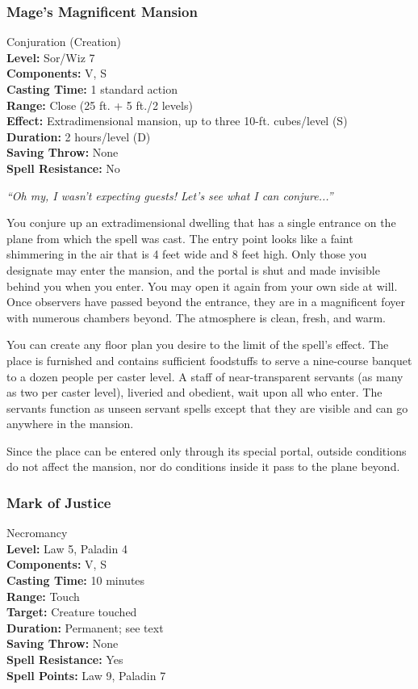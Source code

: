 \subsubsection{Mage's Magnificent Mansion}
\label{Spell:MagnificentMansion}
Conjuration (Creation)
\\ \textbf{Level:} Sor/Wiz 7
\\ \textbf{Components:} V, S
\\ \textbf{Casting Time:} 1 standard action
\\ \textbf{Range:} Close (25 ft. + 5 ft./2 levels)
\\ \textbf{Effect:} Extradimensional mansion, up to three 10-ft. cubes/level (S)
\\ \textbf{Duration:} 2 hours/level (D)
\\ \textbf{Saving Throw:} None
\\ \textbf{Spell Resistance:} No

\emph{``Oh my, I wasn't expecting guests! Let's see what I can conjure...''}

You conjure up an extradimensional dwelling that has a single entrance on the plane from which the spell was cast. 
The entry point looks like a faint shimmering in the air that is 4 feet wide and 8 feet high. 
Only those you designate may enter the mansion, and the portal is shut and made invisible behind you when you enter. 
You may open it again from your own side at will. Once observers have passed beyond the entrance, they are in a magnificent foyer with numerous chambers beyond. 
The atmosphere is clean, fresh, and warm.

You can create any floor plan you desire to the limit of the spell's effect. 
The place is furnished and contains sufficient foodstuffs to serve a nine-course banquet to a dozen people per caster level. 
A staff of near-transparent servants (as many as two per caster level), liveried and obedient, wait upon all who enter. 
The servants function as unseen servant spells except that they are visible and can go anywhere in the mansion.

Since the place can be entered only through its special portal, outside conditions do not affect the mansion, nor do conditions inside it pass to the plane beyond.

\subsubsection{Mark of Justice}
\label{Spell:MarkOfJustice}
Necromancy
\\ \textbf{Level:} Law 5, Paladin 4
\\ \textbf{Components:} V, S
\\ \textbf{Casting Time:} 10 minutes
\\ \textbf{Range:} Touch
\\ \textbf{Target:} Creature touched
\\ \textbf{Duration:} Permanent; see text
\\ \textbf{Saving Throw:} None
\\ \textbf{Spell Resistance:} Yes
\\ \textbf{Spell Points:} Law 9, Paladin 7

